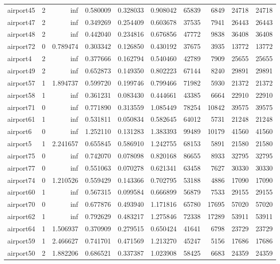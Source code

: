 \begin{longtable}{|l|r|r|r|r|r|r|r|r|r|}
airport45 & 2 & inf & 0.580009 & 0.328033 & 0.908042 & 65839 & 6849 & 24718 & 24718 \\
airport47 & 2 & inf & 0.349269 & 0.254409 & 0.603678 & 37535 & 7941 & 26443 & 26443 \\
airport48 & 2 & inf & 0.442040 & 0.234816 & 0.676856 & 47772 & 9838 & 36408 & 36408 \\
airport72 & 0 & 0.789474 & 0.303342 & 0.126850 & 0.430192 & 37675 & 3935 & 13772 & 13772 \\
airport4 & 2 & inf & 0.377666 & 0.162794 & 0.540460 & 42789 & 7909 & 25655 & 25655 \\
airport49 & 2 & inf & 0.652873 & 0.149350 & 0.802223 & 67144 & 8240 & 29891 & 29891 \\
airport57 & 1 & 1.894737 & 0.599720 & 0.199746 & 0.799466 & 71982 & 5930 & 21372 & 21372 \\
airport58 & 1 & inf & 0.361231 & 0.083430 & 0.444661 & 43385 & 6664 & 22910 & 22910 \\
airport71 & 0 & inf & 0.771890 & 0.313559 & 1.085449 & 78254 & 10842 & 39575 & 39575 \\
airport61 & 1 & inf & 0.531811 & 0.050834 & 0.582645 & 64012 & 5731 & 21248 & 21248 \\
airport6 & 0 & inf & 1.252110 & 0.131283 & 1.383393 & 99489 & 10179 & 41560 & 41560 \\
airport5 & 1 & 2.241657 & 0.655845 & 0.586910 & 1.242755 & 68153 & 5891 & 21580 & 21580 \\
airport75 & 0 & inf & 0.742070 & 0.078098 & 0.820168 & 86655 & 8933 & 32795 & 32795 \\
airport77 & 0 & inf & 0.551063 & 0.070278 & 0.621341 & 63458 & 7627 & 30330 & 30330 \\
airport74 & 0 & 1.210526 & 0.559429 & 0.143366 & 0.702795 & 53188 & 4886 & 17090 & 17090 \\
airport60 & 1 & inf & 0.567315 & 0.099584 & 0.666899 & 56879 & 7533 & 29155 & 29155 \\
airport70 & 0 & inf & 0.677876 & 0.493940 & 1.171816 & 65780 & 17695 & 57020 & 57020 \\
airport62 & 1 & inf & 0.792629 & 0.483217 & 1.275846 & 72338 & 17289 & 53911 & 53911 \\
airport64 & 1 & 1.506937 & 0.370909 & 0.279515 & 0.650424 & 41641 & 6798 & 23729 & 23729 \\
airport59 & 1 & 2.466627 & 0.741701 & 0.471569 & 1.213270 & 45247 & 5156 & 17686 & 17686 \\
airport50 & 2 & 1.882206 & 0.686521 & 0.337387 & 1.023908 & 58425 & 6683 & 24359 & 24359 \\

\end{longtable}
